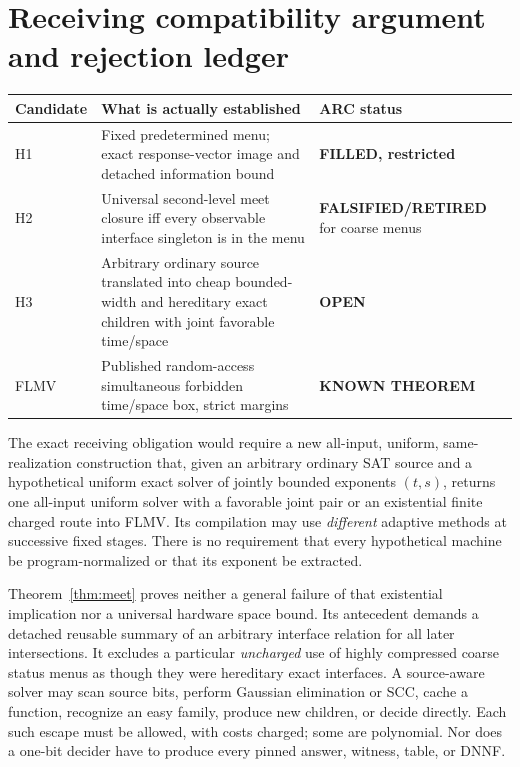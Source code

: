 \documentclass[11pt]{article}
\begin{document}
\section{Receiving compatibility argument and rejection ledger}
\begin{center}\small
\begin{tabular}{p{.14\linewidth}p{.45\linewidth}p{.28\linewidth}}
\toprule
Candidate & What is actually established & ARC status\\ \midrule
H1 & Fixed predetermined menu; exact response-vector image and
detached information bound & \textbf{FILLED, restricted}\\
H2 & Universal second-level meet closure iff every observable
interface singleton is in the menu & \textbf{FALSIFIED/RETIRED}
for coarse menus\\
H3 & Arbitrary ordinary source translated into cheap bounded-width
and hereditary exact children with joint favorable time/space &
\textbf{OPEN}\\
FLMV & Published random-access simultaneous forbidden time/space
box, strict margins & \textbf{KNOWN THEOREM}\\
\bottomrule
\end{tabular}
\end{center}

The exact receiving obligation would require a new all-input,
uniform, same-realization construction that, given an arbitrary
ordinary SAT source and a hypothetical uniform exact solver
of jointly bounded exponents \((t,s)\), returns one all-input
uniform solver with a favorable joint pair or an existential
finite charged route into FLMV. Its compilation may use
\emph{different} adaptive methods at successive fixed stages.
There is no requirement that every hypothetical machine be
program-normalized or that its exponent be extracted.

Theorem~\ref{thm:meet} proves neither a general failure
of that existential implication nor a universal hardware
space bound. Its antecedent demands a detached reusable
summary of an arbitrary interface relation for all later
intersections. It excludes a particular \emph{uncharged}
use of highly compressed coarse status menus as though
they were hereditary exact interfaces. A source-aware solver
may scan source bits, perform Gaussian elimination or SCC,
cache a function, recognize an easy family, produce new
children, or decide directly. Each such escape must be
allowed, with costs charged; some are polynomial.
Nor does a one-bit decider have to produce every pinned
answer, witness, table, or DNNF.
\end{document}
